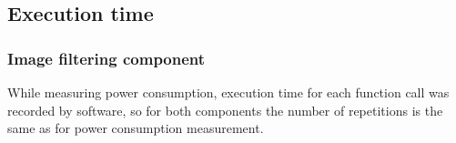 \documentclass{sig-alternate}
\begin{document}
\subsection{Execution time}
\label{sec:executionTime}

\subsubsection*{Image filtering component}

While measuring power consumption, execution time for each function call was recorded by software, so for both components the number of repetitions is the same as for power consumption measurement. %
\end{document}
